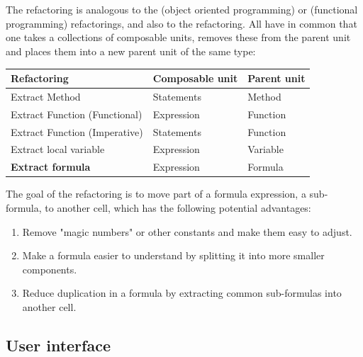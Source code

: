 \section{}

The  refactoring is analogous to the  (object oriented programming) or  (functional programming) refactorings, and also to the  refactoring.
All have in common that one takes a collections of composable units, removes these from the parent unit and places them into a new parent unit of the same type:

\begin{tabular}{@{}lll@{}}
	\toprule
	Refactoring & Composable unit & Parent unit \\
	\midrule
	Extract Method & Statements & Method \\
	Extract Function (Functional) & Expression & Function \\
	Extract Function (Imperative) & Statements & Function \\
	Extract local variable & Expression & Variable \\
	\textbf{Extract formula} & Expression & Formula \\
	\bottomrule
\end{tabular}

The goal of the  refactoring is to move part of a formula expression, a sub-formula, to another cell, which has the following potential advantages:

\begin{enumerate}
\item Remove "magic numbers" or other constants and make them easy to adjust.
\item Make a formula easier to understand by splitting it into more smaller components.
\item Reduce duplication in a formula by extracting common sub-formulas into another cell.
\end{enumerate}

\subsection{User interface}

